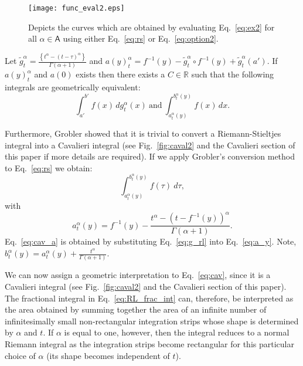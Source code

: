 \documentclass[twoside,reqno,11pt]{fcaa-var} %
\begin{document}
\begin{figure}[htb]
\centering
\texttt{[image: func\_eval2.eps]}
\caption{Depicts the curves which are obtained by evaluating Eq.~\eqref{eq:ex2} for all $\alpha\in \mathsf{A}$ using either Eq.~\eqref{eq:rs} or Eq.~\eqref{eq:option2}.}
\label{fig:eval2}
\end{figure}






\begin{theorem}
Let $\widetilde{g}_t^{\alpha}=\frac{\left \{t^{\alpha} - (t-\tau)^{\alpha} \right \}}{\Gamma(\alpha+1)}$ and $a(y)_{t}^{\alpha} = f^{-1}(y) - \widetilde{g}_t^{\alpha}\circ f^{-1}(y) + \widetilde{g}_t^{\alpha}(a')$. If $a(y)_t^{\alpha}$ and $a(0)$ exists then  
there exists a $C\in \mathbb{R}$ such that the following integrals are geometrically equivalent:
\begin{equation}
\int_{a'}^{b'} f(x)\,dg_t^{\alpha}(x)~\textrm{and}~\int_{a_t^{\alpha}(y)}^{b_t^{\alpha}(y)} f(x)\,dx. 
\end{equation}
\end{theorem}





\noindent
Furthermore, Grobler showed that it is trivial to convert a Riemann-Stieltjes integral into a Cavalieri integral \cite{ackermann12,grobler19} (see Fig.~\ref{fig:caval2} and the Cavalieri section of this paper if more details are required). If we apply Grobler's conversion method to Eq.~\eqref{eq:rs} we obtain:
\begin{equation}
\label{eq:cav}
\int_{a_t^{\alpha}(y)}^{b_t^{\alpha}(y)} f(\tau)~d\tau, 
\end{equation}
with
\begin{equation}
\label{eq:cav_a}
a_t^{\alpha}(y) = f^{-1}(y) - \frac{t^{\alpha}-(t-f^{-1}(y))^{\alpha}}{\Gamma(\alpha+1)}.
\end{equation}
Eq.~\eqref{eq:cav_a} is obtained by substituting Eq.~\eqref{eq:g_rl} into Eq.~\eqref{eq:a_y}. Note, $b_t^{\alpha}(y) = a_t^{\alpha}(y) + \frac{t^{\alpha}}{\Gamma(\alpha+1)}$. 

\noindent
We can now assign a geometric interpretation to Eq.~\eqref{eq:cav}, since it is a Cavalieri integral (see Fig.~\ref{fig:caval2} and the Cavalieri section of this paper). The fractional integral in Eq.~\eqref{eq:RL_frac_int} can, therefore, be interpreted as the area obtained 
by summing together the area of an infinite number of infinitesimally small non-rectangular integration strips whose shape is determined by $\alpha$ and $t$. If $\alpha$ is equal to one, however, then the integral reduces to a normal Riemann integral as the integration strips become rectangular for this particular choice of $\alpha$ (its shape becomes independent of $t$).\\
\end{document}
